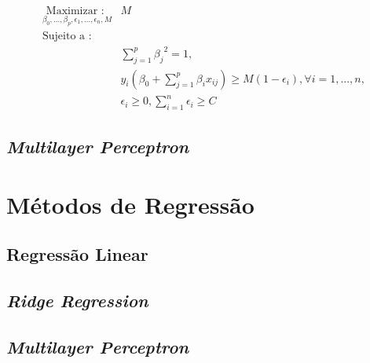 \begin{equation}
\begin{split}
\underset {\beta_0, ..., \beta_p, \epsilon_1, ..., \epsilon_n, M}  {\text{Maximizar : }} &{M} \\
\text{Sujeito a : } \\
&\sum_{j=1}^{p}{{\beta_j}^2} = 1, \\
&y_i(\beta_0 + \sum_{j=1}^{p}{{\beta_i x_{ij}}}) \geq M(1 - \epsilon_i), \forall i = 1, ..., n, \\
&\epsilon_i \geq 0,  \sum_{i=1}^{n}{\epsilon_i} \geq C
\end{split}
\label{eq:SVMInseparavel}
\end{equation}




	
\subsection{\textit{Multilayer Perceptron}}

\section{Métodos de Regressão}
\subsection{Regressão Linear}
\subsection{\textit{Ridge Regression}}
\subsection{\textit{Multilayer Perceptron}}